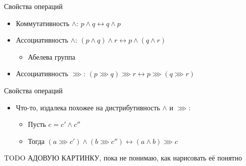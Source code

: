 \begin{frame}{Свойства операций}
  \begin{itemize}
  \item Коммутативность $\wedge$: $p \wedge q \longleftrightarrow q
    \wedge p$
  \item Ассоциативность $\wedge$: $(p \wedge q) \wedge r
    \longleftrightarrow p \wedge (q \wedge r)$
    \begin{itemize}
    \item Абелева группа
    \end{itemize}
  \item Ассоциативность $\ggg$: $(p \ggg q) \ggg r \longleftrightarrow
    p \ggg (q \ggg r)$
  \end{itemize}
\end{frame}

\begin{frame}{Свойства операций}
  \begin{itemize}
  \item Что-то, издалека похожее на дистрибутивность $\wedge$ и $\ggg$:
    \begin{itemize}
    \item Пусть $c = c' \wedge c''$
    \item Тогда $(a \ggg c') \wedge (b \ggg c'') \longleftrightarrow
      (a \wedge b) \ggg c$
    \end{itemize}
  \end{itemize}
  
TODO АДОВУЮ КАРТИНКУ, пока не понимаю, как нарисовать её понятно
\end{frame}